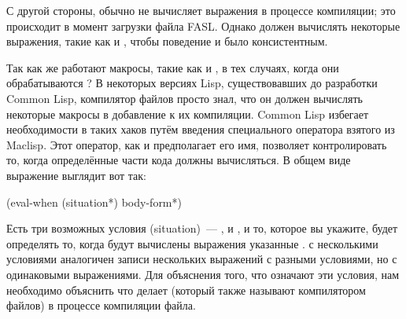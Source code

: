 С другой стороны,  обычно не вычисляет выражения в процессе компиляции;
это происходит в момент загрузки файла FASL. Однако  должен вычислять
некоторые выражения, такие как  и , чтобы поведение
 и  было консистентным.

Так как же работают макросы, такие как  и , в тех случаях,
когда они обрабатываются ?  В некоторых версиях Lisp, существовавших до
разработки Common Lisp, компилятор файлов просто знал, что он должен вычислять некоторые
макросы в добавление к их компиляции.  Common Lisp избегает необходимости в таких хаков
путём введения специального оператора  взятого из Maclisp.  Этот оператор,
как и предполагает его имя, позволяет контролировать то, когда определённые части кода
должны вычисляться. В общем виде выражение  выглядит вот так:

\begin{myverb}
(eval-when (situation*)
  body-form*)
\end{myverb}

Есть три возможных условия (situation)~--- , 
и , и то, которое вы укажите, будет определять то, когда будут вычислены
выражения указанные .   с несколькими условиями
аналогичен записи нескольких выражений  с разными условиями, но с
одинаковыми выражениями.  Для объяснения того, что означают эти условия, нам необходимо
объяснить что делает  (который также называют компилятором файлов) в
процессе компиляции файла.

